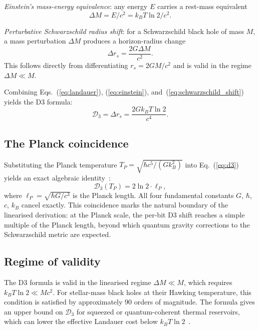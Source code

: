 \documentclass[aps,prd,twocolumn,showpacs,preprintnumbers,amsmath,amssymb,longbibliography]{revtex4-2}
\begin{document}
\textit{Einstein's mass-energy equivalence}: any energy $E$ carries a rest-mass equivalent
\begin{equation}
\Delta M = E/c^2 = k_B T \ln 2 / c^2.
\label{eq:einstein}
\end{equation}

\textit{Perturbative Schwarzschild radius shift}: for a Schwarzschild black hole of mass $M$, 
a mass perturbation $\Delta M$ produces a horizon-radius change
\begin{equation}
\Delta r_s = \frac{2G \Delta M}{c^2}.
\label{eq:schwarzschild_shift}
\end{equation}
This follows directly from differentiating $r_s = 2GM/c^2$ and is valid in the regime 
$\Delta M \ll M$.

Combining Eqs.~(\ref{eq:landauer}), (\ref{eq:einstein}), and~(\ref{eq:schwarzschild_shift}) 
yields the D3 formula:
\begin{equation}
\mathcal{D}_3 = \Delta r_s = \frac{2G k_B T \ln 2}{c^4}.
\label{eq:d3}
\end{equation}

\subsection{The Planck coincidence}

Substituting the Planck temperature $T_P = \sqrt{\hbar c^5/(Gk_B^2)}$ into Eq.~(\ref{eq:d3}) 
yields an exact algebraic identity~\cite{sharma2026d3}:
\begin{equation}
\mathcal{D}_3(T_P) = 2\ln 2 \cdot \ell_P,
\label{eq:planck_coincidence}
\end{equation}
where $\ell_P = \sqrt{\hbar G/c^3}$ is the Planck length. All four fundamental constants 
$G$, $\hbar$, $c$, $k_B$ cancel exactly. This coincidence marks the natural boundary of 
the linearised derivation: at the Planck scale, the per-bit D3 shift reaches a simple 
multiple of the Planck length, beyond which quantum gravity corrections to the Schwarzschild 
metric are expected.

\subsection{Regime of validity}

The D3 formula is valid in the linearised regime $\Delta M \ll M$, which requires 
$k_B T \ln 2 \ll Mc^2$. For stellar-mass black holes at their Hawking temperature, this 
condition is satisfied by approximately 90 orders of magnitude. The formula gives an upper 
bound on $\mathcal{D}_3$ for squeezed or quantum-coherent thermal reservoirs, which can 
lower the effective Landauer cost below $k_B T \ln 2$~\cite{klaers2019}.
\end{document}
